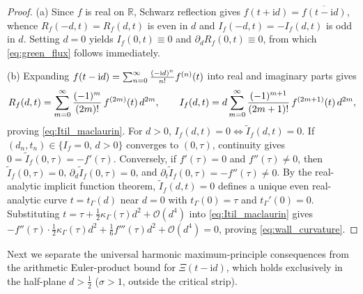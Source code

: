 \documentclass[11pt,a4paper,reqno]{amsart}
\theoremstyle{definition}
\theoremstyle{remark}
\numberwithin{equation}{section}
\newcommand{\ii}{\mathrm{i}}
\newcommand{\fac}{\mathclose{\mathchar"0021}}
\begin{document}
\begin{proof}
(a) Since $f$ is real on $\mathbb{R}$, Schwarz reflection gives $f(t+\ii d) = \overline{f(t-\ii d)}$, whence $R_f(-d,t) = R_f(d,t)$ is even in $d$ and $I_f(-d,t) = -I_f(d,t)$ is odd in $d$. Setting $d = 0$ yields $I_f(0,t) \equiv 0$ and $\partial_d R_f(0,t) \equiv 0$, from which \eqref{eq:green_flux} follows immediately.

(b) Expanding $f(t-\ii d) = \sum_{n=0}^\infty \frac{(-\ii d)^n}{n\fac}f^{(n)}(t)$ into real and imaginary parts gives
\begin{equation}\label{eq:RI_taylor_d}
R_f(d,t) = \sum_{m=0}^\infty \frac{(-1)^m}{(2m)\fac}\,f^{(2m)}(t)\,d^{2m}, \qquad
I_f(d,t) = d\sum_{m=0}^\infty \frac{(-1)^{m+1}}{(2m+1)\fac}\,f^{(2m+1)}(t)\,d^{2m},
\end{equation}
proving \eqref{eq:Itil_maclaurin}. For $d > 0$, $I_f(d,t) = 0 \iff \widetilde{I}_f(d,t) = 0$. If $(d_n, t_n) \in \{I_f = 0,\, d > 0\}$ converges to $(0,\tau)$, continuity gives $0 = \widetilde{I}_f(0,\tau) = -f'(\tau)$. Conversely, if $f'(\tau) = 0$ and $f''(\tau) \neq 0$, then $\widetilde{I}_f(0,\tau) = 0$, $\partial_d\widetilde{I}_f(0,\tau) = 0$, and $\partial_t\widetilde{I}_f(0,\tau) = -f''(\tau) \neq 0$. By the real-analytic implicit function theorem, $\widetilde{I}_f(d,t) = 0$ defines a unique even real-analytic curve $t = t_\Gamma(d)$ near $d = 0$ with $t_\Gamma(0) = \tau$ and $t_\Gamma'(0) = 0$. Substituting $t = \tau + \frac{1}{2}\kappa_\Gamma(\tau)d^2 + \mathcal{O}(d^4)$ into \eqref{eq:Itil_maclaurin} gives $-f''(\tau)\cdot\frac{1}{2}\kappa_\Gamma(\tau)d^2 + \frac{1}{6}f'''(\tau)d^2 + \mathcal{O}(d^4) = 0$, proving \eqref{eq:wall_curvature}.
\end{proof}

Next we separate the universal harmonic maximum-principle consequences from the arithmetic Euler-product bound for $\Xi(t-\ii d)$, which holds exclusively in the half-plane $d > \frac{1}{2}$ ($\sigma > 1$, outside the critical strip).
\end{document}
